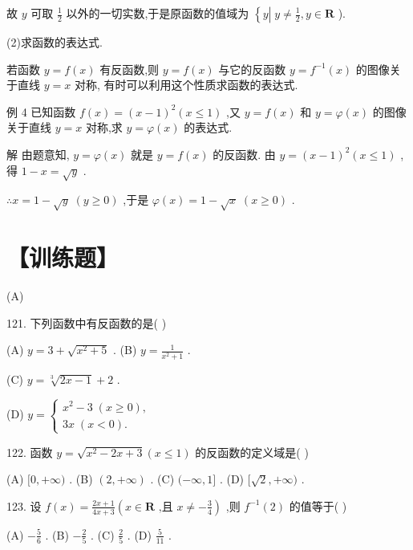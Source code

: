 \documentclass[10pt]{article}
\begin{document}
故 \(y\) 可取 \(\frac{1}{2}\) 以外的一切实数,于是原函数的值域为 \(\left\{  {y\left| {\;y \neq  \frac{1}{2}}\right. ,y \in  \mathbf{R}}\right.\) ).

(2)求函数的表达式.

若函数 \(y = f\left( x\right)\) 有反函数,则 \(y = f\left( x\right)\) 与它的反函数 \(y = {f}^{-1}\left( x\right)\) 的图像关于直线 \(y = x\) 对称, 有时可以利用这个性质求函数的表达式.

例 4 已知函数 \(f\left( x\right)  = {\left( x - 1\right) }^{2}\left( {x \leq  1}\right)\) ,又 \(y = f\left( x\right)\) 和 \(y = \varphi \left( x\right)\) 的图像关于直线 \(y = x\) 对称,求 \(y = \varphi \left( x\right)\) 的表达式.

解 由题意知, \(y = \varphi \left( x\right)\) 就是 \(y = f\left( x\right)\) 的反函数. 由 \(y = {\left( x - 1\right) }^{2}\left( {x \leq  1}\right)\) ,得 \(1 - x = \sqrt{y}\) .

\(\therefore x = 1 - \sqrt{y}\;\left( {y \geq  0}\right)\) ,于是 \(\varphi \left( x\right)  = 1 - \sqrt{x}\;\left( {x \geq  0}\right)\) .

\section*{【训练题】}

(A)

121. 下列函数中有反函数的是( )

(A) \(y = 3 + \sqrt{{x}^{2} + 5}\) . (B) \(y = \frac{1}{{x}^{2} + 1}\) .

(C) \(y = \sqrt[3]{{2x} - 1} + 2\) .

(D) \(y = \left\{  \begin{array}{l} {x}^{2} - 3\;\left( {x \geq  0}\right) , \\  {3x}\;\left( {x < 0}\right) . \end{array}\right.\)

122. 函数 \(y = \sqrt{{x}^{2} - {2x} + 3}\left( {x \leq  1}\right)\) 的反函数的定义域是( )

(A) \(\lbrack 0, + \infty )\) . (B) \(\left( {2, + \infty }\right)\) . (C) \(( - \infty ,1\rbrack\) . (D) \(\lbrack \sqrt{2}, + \infty )\) .

123. 设 \(f\left( x\right)  = \frac{{2x} + 1}{{4x} + 3}\left( {x \in  \mathbf{R}\text{ ,且 }x \neq   - \frac{3}{4}}\right)\) ,则 \({f}^{-1}\left( 2\right)\) 的值等于(   )

(A) \(- \frac{5}{6}\) . (B) \(- \frac{2}{5}\) . (C) \(\frac{2}{5}\) . (D) \(\frac{5}{11}\) .
\end{document}
